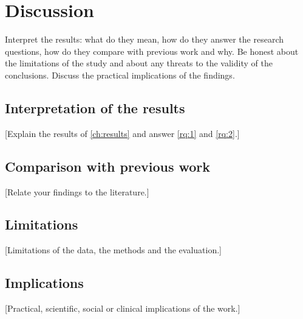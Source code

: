 \chapter{Discussion}\label{ch:discussion}

\begin{guidance}
Interpret the results: what do they mean, how do they answer the research questions, how
do they compare with previous work and why. Be honest about the limitations of the study
and about any threats to the validity of the conclusions. Discuss the practical
implications of the findings.
\end{guidance}

\section{Interpretation of the results}\label{sec:interpretation}

[Explain the results of \autoref{ch:results} and answer \ref{rq:1} and \ref{rq:2}.]

\section{Comparison with previous work}\label{sec:discussion-previous-work}

[Relate your findings to the literature.]

\section{Limitations}\label{sec:limitations}

[Limitations of the data, the methods and the evaluation.]

\section{Implications}\label{sec:implications}

[Practical, scientific, social or clinical implications of the work.]
